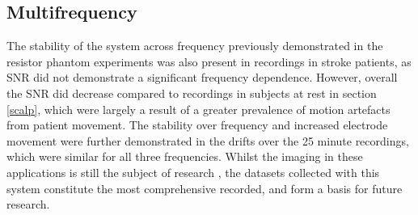 \subsection{Multifrequency}
The stability of the system across frequency previously demonstrated in the resistor phantom experiments was also present in recordings in stroke patients, as SNR did not demonstrate a significant frequency dependence. However, overall the SNR did decrease compared to recordings in subjects at rest in section \ref{scalp}, which were largely a result of a greater prevalence of motion artefacts from patient movement. The stability over frequency and increased electrode movement were further demonstrated in the drifts over the 25 minute recordings, which were similar for all three frequencies. Whilst the imaging in these applications is still the subject of research \cite{malone2015} \cite{jang2015detection}, the datasets collected with this system constitute the most comprehensive recorded, and form a basis for future research. 
